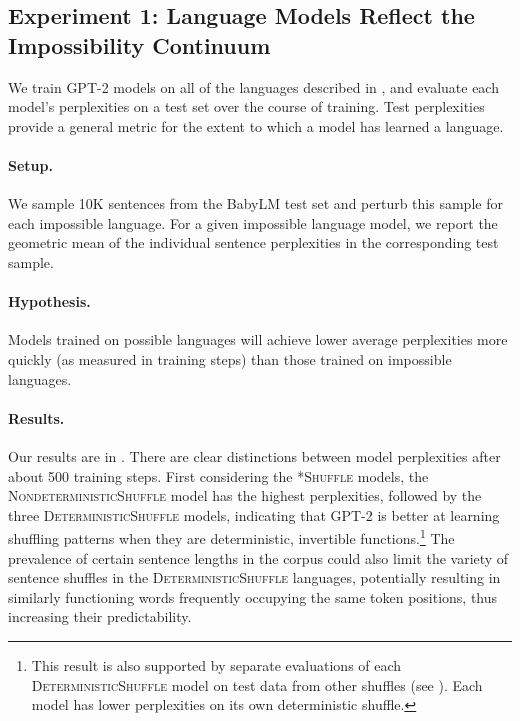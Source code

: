 \documentclass[11pt]{article}
\begin{document}
\subsection{Experiment 1: Language Models Reflect the Impossibility Continuum}
\label{sec:perplexities}

We train GPT-2 models on all of the languages described in , and evaluate each model's perplexities on a test set over the course of training. Test perplexities provide a general metric for the extent to which a model has learned a language.



\paragraph{Setup.}
We sample 10K sentences from the BabyLM test set and perturb this sample for each impossible language. For a given impossible language model, we report the geometric mean of the individual sentence perplexities in the corresponding test sample.

\paragraph{Hypothesis.}  Models trained on possible languages will achieve lower average perplexities more quickly (as measured in training steps) than those trained on impossible languages.

\paragraph{Results.} Our results are in .
There are clear distinctions between model perplexities after about 500 training steps. First considering the \textsc{*Shuffle} models, the \textsc{NondeterministicShuffle} model has the highest perplexities, followed by the three \textsc{DeterministicShuffle} models, indicating that GPT-2 is better at learning shuffling patterns when they are deterministic, invertible functions.\footnote{This result is also supported by separate evaluations of each \textsc{DeterministicShuffle} model on test data from other shuffles (see ). Each model has lower perplexities on its own deterministic shuffle.} 
The prevalence of certain sentence lengths in the corpus could also limit the variety of sentence shuffles in the \textsc{DeterministicShuffle} languages, potentially resulting in similarly functioning words frequently occupying the same token positions, thus increasing their predictability.
\end{document}
